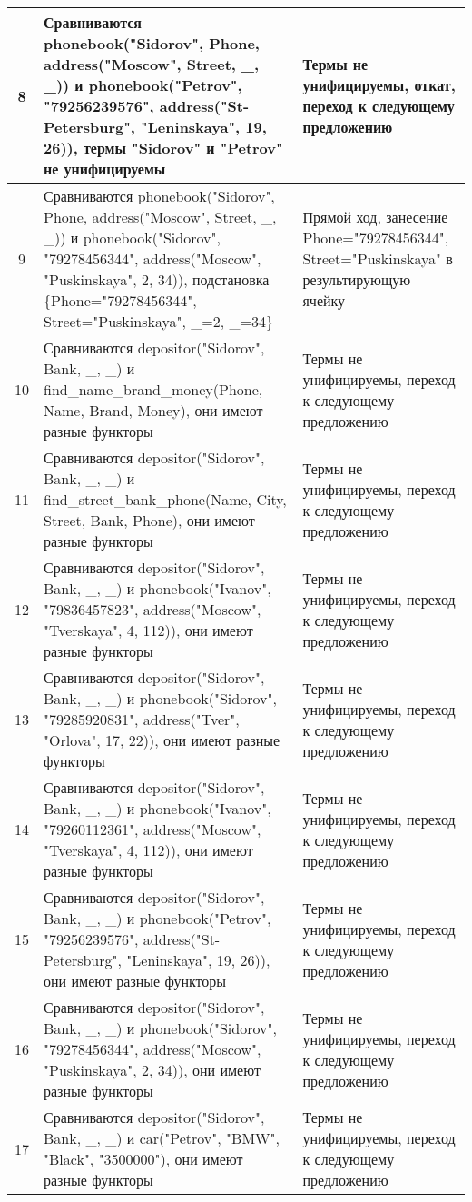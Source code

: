 \documentclass[a4paper,12pt]{article}
\begin{document}
\begin{table}[ht!] 
	\begin{tabularx}{\linewidth}{|c|>{\centering}X|>{\centering}X|}
		\hline
		8 & Сравниваются phonebook("Sidorov"{}, Phone, address("Moscow"{}, Street, \_, \_)) и  phonebook("Petrov"{}, "79256239576"{}, address("St-Petersburg"{}, "Leninskaya"{}, 19, 26)), термы "Sidorov"{} и "Petrov"{} не унифицируемы & Термы не унифицируемы, откат, переход к следующему предложению\tabularnewline
		\hline
		9 & Сравниваются phonebook("Sidorov"{}, Phone, address("Moscow"{}, Street, \_, \_)) и  phonebook("Sidorov"{}, "79278456344"{}, address("Moscow"{}, "Puskinskaya"{}, 2, 34)), подстановка \{Phone="79278456344"{}, Street="Puskinskaya"{}, \_=2, \_=34\} & Прямой ход, занесение Phone="79278456344"{}, Street="Puskinskaya"{} в результирующую ячейку\tabularnewline
		\hline
		10 & Сравниваются depositor("Sidorov"{}, Bank, \_, \_) и find\_name\_brand\_money(Phone, Name, Brand, Money), они имеют разные функторы & Термы не унифицируемы, переход к следующему предложению \tabularnewline
		\hline
		11 & Сравниваются depositor("Sidorov"{}, Bank, \_, \_) и find\_street\_bank\_phone(Name, City, Street, Bank, Phone), они имеют разные функторы & Термы не унифицируемы, переход к следующему предложению \tabularnewline
		\hline
		12 & Сравниваются depositor("Sidorov"{}, Bank, \_, \_) и phonebook("Ivanov"{}, "79836457823"{}, address("Moscow"{}, "Tverskaya"{}, 4, 112)), они имеют разные функторы & Термы не унифицируемы, переход к следующему предложению \tabularnewline
		\hline
		13 & Сравниваются depositor("Sidorov"{}, Bank, \_, \_) и phonebook("Sidorov"{}, "79285920831"{}, address("Tver"{}, "Orlova"{}, 17, 22)), они имеют разные функторы & Термы не унифицируемы, переход к следующему предложению \tabularnewline
		\hline
		14 & Сравниваются depositor("Sidorov"{}, Bank, \_, \_) и phonebook("Ivanov"{}, "79260112361"{}, address("Moscow"{}, "Tverskaya"{}, 4, 112)), они имеют разные функторы & Термы не унифицируемы, переход к следующему предложению \tabularnewline
		\hline
		15 & Сравниваются depositor("Sidorov"{}, Bank, \_, \_) и phonebook("Petrov"{}, "79256239576"{}, address("St-Petersburg"{}, "Leninskaya"{}, 19, 26)), они имеют разные функторы & Термы не унифицируемы, переход к следующему предложению \tabularnewline
		\hline
		16 & Сравниваются depositor("Sidorov"{}, Bank, \_, \_) и phonebook("Sidorov"{}, "79278456344"{}, address("Moscow"{}, "Puskinskaya"{}, 2, 34)), они имеют разные функторы & Термы не унифицируемы, переход к следующему предложению \tabularnewline
		\hline
		17 & Сравниваются depositor("Sidorov"{}, Bank, \_, \_) и car("Petrov"{}, "BMW"{}, "Black"{}, "3500000"), они имеют разные функторы & Термы не унифицируемы, переход к следующему предложению \tabularnewline
		\hline
	\end{tabularx}
\end{table}
\end{document}
